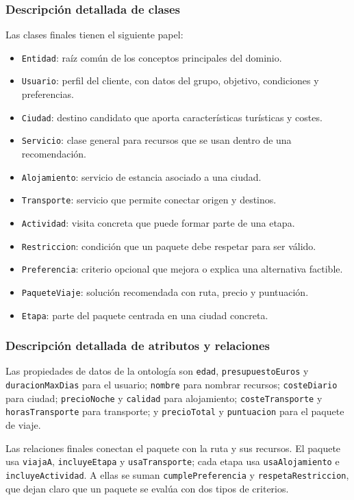 \documentclass[11pt,a4paper]{article}
\begin{document}
\subsubsection{Descripci\'on detallada de clases}
Las clases finales tienen el siguiente papel:
\begin{itemize}
    \item \texttt{Entidad}: ra\'iz com\'un de los conceptos principales del
    dominio.
    \item \texttt{Usuario}: perfil del cliente, con datos del grupo, objetivo,
    condiciones y preferencias.
    \item \texttt{Ciudad}: destino candidato que aporta caracter\'isticas
    tur\'isticas y costes.
    \item \texttt{Servicio}: clase general para recursos que se usan dentro de
    una recomendaci\'on.
    \item \texttt{Alojamiento}: servicio de estancia asociado a una ciudad.
    \item \texttt{Transporte}: servicio que permite conectar origen y destinos.
    \item \texttt{Actividad}: visita concreta que puede formar parte de una
    etapa.
    \item \texttt{Restriccion}: condici\'on que un paquete debe respetar para
    ser v\'alido.
    \item \texttt{Preferencia}: criterio opcional que mejora o explica una
    alternativa factible.
    \item \texttt{PaqueteViaje}: soluci\'on recomendada con ruta, precio y
    puntuaci\'on.
    \item \texttt{Etapa}: parte del paquete centrada en una ciudad concreta.
\end{itemize}

\subsubsection{Descripci\'on detallada de atributos y relaciones}
Las propiedades de datos de la ontolog\'ia son \texttt{edad},
\texttt{presupuestoEuros} y \texttt{duracionMaxDias} para el usuario;
\texttt{nombre} para nombrar recursos; \texttt{costeDiario} para ciudad;
\texttt{precioNoche} y \texttt{calidad} para alojamiento;
\texttt{costeTransporte} y \texttt{horasTransporte} para transporte; y
\texttt{precioTotal} y \texttt{puntuacion} para el paquete de viaje.

Las relaciones finales conectan el paquete con la ruta y sus recursos. El
paquete usa \texttt{viajaA}, \texttt{incluyeEtapa} y
\texttt{usaTransporte}; cada etapa usa \texttt{usaAlojamiento} e
\texttt{incluyeActividad}. A ellas se suman \texttt{cumplePreferencia} y
\texttt{respetaRestriccion}, que dejan claro que un paquete se eval\'ua con
dos tipos de criterios.
\end{document}
